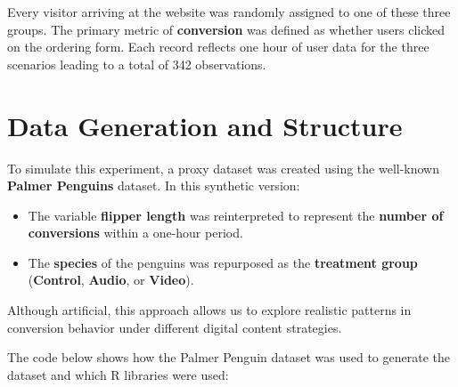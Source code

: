 \documentclass[
  letterpaper,
  DIV=11,
  numbers=noendperiod]{scrartcl}
\newenvironment{Shaded}{\begin{snugshade}}{\end{snugshade}}
\newcommand{\AttributeTok}[1]{\textcolor[rgb]{0.40,0.45,0.13}{#1}}
\newcommand{\FunctionTok}[1]{\textcolor[rgb]{0.28,0.35,0.67}{#1}}
\newcommand{\NormalTok}[1]{\textcolor[rgb]{0.00,0.23,0.31}{#1}}
\newcommand{\OtherTok}[1]{\textcolor[rgb]{0.00,0.23,0.31}{#1}}
\newcommand{\SpecialCharTok}[1]{\textcolor[rgb]{0.37,0.37,0.37}{#1}}
\newcommand{\StringTok}[1]{\textcolor[rgb]{0.13,0.47,0.30}{#1}}
\providecommand{\tightlist}{%
  \setlength{\itemsep}{0pt}\setlength{\parskip}{0pt}}\usepackage{longtable,booktabs,array}
\begin{document}
Every visitor arriving at the website was randomly assigned to one of
these three groups. The primary metric of \textbf{conversion} was
defined as whether users clicked on the ordering form. Each record
reflects one hour of user data for the three scenarios leading to a
total of 342 observations.

\section{Data Generation and
Structure}\label{data-generation-and-structure}

To simulate this experiment, a proxy dataset was created using the
well-known \textbf{Palmer Penguins} dataset. In this synthetic version:

\begin{itemize}
\tightlist
\item
  The variable \textbf{flipper length} was reinterpreted to represent
  the \textbf{number of conversions} within a one-hour period.
\item
  The \textbf{species} of the penguins was repurposed as the
  \textbf{treatment group} (\textbf{Control}, \textbf{Audio}, or
  \textbf{Video}).
\end{itemize}

Although artificial, this approach allows us to explore realistic
patterns in conversion behavior under different digital content
strategies.

The code below shows how the Palmer Penguin dataset was used to generate
the dataset and which R libraries were used:

\begin{Shaded}
\end{Shaded}
\end{document}
